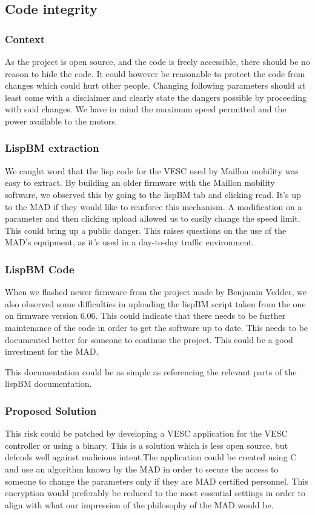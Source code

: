 \subsection{Code integrity}
\subsubsection{Context}
As the project is open source, and the code is freely accessible, there should be no reason to hide the code. It could however be reasonable to protect the code from changes which could hurt other people. Changing following parameters should at least come with a disclaimer and clearly state the dangers possible by proceeding with said changes. We have in mind the maximum speed permitted and the power available to the motors.

\subsubsection{LispBM extraction}
We caught word that the lisp code for the VESC used by Maillon mobility was easy to extract. By building an older firmware with the Maillon mobility software, we observed this by going to the lispBM tab and clicking read. It's up to the MAD if they would like to reinforce this mechanism. A modification on a parameter and then clicking upload allowed us to easily change the speed limit. This could bring up a public danger. This raises questions on the use of the MAD's equipment, as it's used in a day-to-day traffic environment. 

\subsubsection{LispBM Code}
When we flashed newer firmware from the project made by Benjamin Vedder\cite{b1}, we also observed some difficulties in uploading the lispBM script taken from the one on firmware version 6.06. This could indicate that there needs to be further maintenance of the code in order to get the software up to date. This needs to be documented better for someone  to continue the project. This could be a good investment for the MAD.

This documentation could be as simple as referencing the relevant parts of the lispBM documentation. \cite{b2}

\subsubsection{Proposed Solution}
This risk could be patched by developing a VESC application for the VESC controller or using a binary. This is a solution which is less open source, but defends well against malicious intent.The application could be created using C and use an algorithm known by the MAD in order to secure the access to someone to change the parameters only if they are MAD certified personnel. This encryption would preferably be reduced to the most essential settings in order to align with what our impression of the philosophy of the MAD would be.


